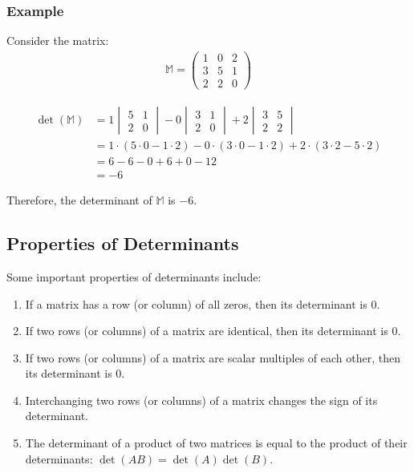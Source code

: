 \documentclass{article}
\begin{document}
\subsubsection*{Example}
Consider the matrix:
\begin{align*}
    \mathbb{M} =
    \begin{pmatrix}
        1 & 0 & 2 \\
        3 & 5 & 1 \\
        2 & 2 & 0
    \end{pmatrix}
\end{align*}

\begin{align*}
    \det(\mathbb{M}) & = 1 \begin{vmatrix}
                               5 & 1 \\
                               2 & 0
                           \end{vmatrix}
    - 0 \begin{vmatrix}
            3 & 1 \\
            2 & 0
        \end{vmatrix}
    + 2 \begin{vmatrix}
            3 & 5 \\
            2 & 2
        \end{vmatrix}                                                                                                       \\
                     & = 1 \cdot (5 \cdot 0 - 1 \cdot 2) - 0 \cdot (3 \cdot 0 - 1 \cdot 2) + 2 \cdot (3 \cdot 2 - 5 \cdot 2) \\
                     & = 6 - 6 - 0 + 6 + 0 - 12                                                                              \\
                     & = -6
\end{align*}

Therefore, the determinant of $\mathbb{M}$ is $-6$.

\subsection{Properties of Determinants}
Some important properties of determinants include:

\begin{enumerate}
    \item If a matrix has a row (or column) of all zeros, then its determinant is 0.
    \item If two rows (or columns) of a matrix are identical, then its determinant is 0.
    \item If two rows (or columns) of a matrix are scalar multiples of each other, then its determinant is 0.
    \item Interchanging two rows (or columns) of a matrix changes the sign of its determinant.
    \item The determinant of a product of two matrices is equal to the product of their determinants: $\det(AB) = \det(A) \det(B)$.
\end{enumerate}
\end{document}
